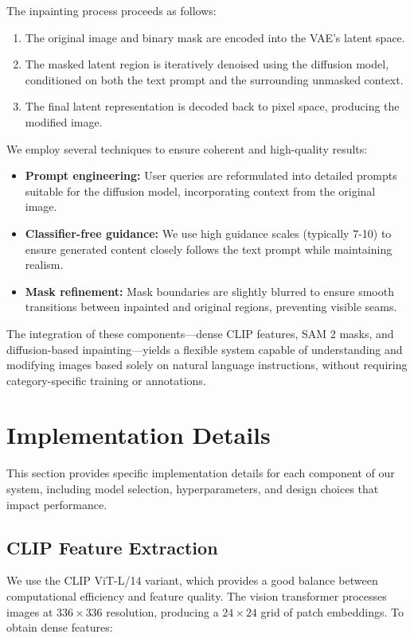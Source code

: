 The inpainting process proceeds as follows:
\begin{enumerate}
    \item The original image and binary mask are encoded into the VAE's latent space.
    \item The masked latent region is iteratively denoised using the diffusion model, conditioned on both the text prompt and the surrounding unmasked context.
    \item The final latent representation is decoded back to pixel space, producing the modified image.
\end{enumerate}

We employ several techniques to ensure coherent and high-quality results:
\begin{itemize}
    \item \textbf{Prompt engineering:} User queries are reformulated into detailed prompts suitable for the diffusion model, incorporating context from the original image.
    \item \textbf{Classifier-free guidance:} We use high guidance scales (typically 7-10) to ensure generated content closely follows the text prompt while maintaining realism.
    \item \textbf{Mask refinement:} Mask boundaries are slightly blurred to ensure smooth transitions between inpainted and original regions, preventing visible seams.
\end{itemize}

The integration of these components—dense CLIP features, SAM 2 masks, and diffusion-based inpainting—yields a flexible system capable of understanding and modifying images based solely on natural language instructions, without requiring category-specific training or annotations.

\section{Implementation Details}
This section provides specific implementation details for each component of our system, including model selection, hyperparameters, and design choices that impact performance.

\subsection{CLIP Feature Extraction}

We use the CLIP ViT-L/14 variant, which provides a good balance between computational efficiency and feature quality. The vision transformer processes images at $336 \times 336$ resolution, producing a $24 \times 24$ grid of patch embeddings. To obtain dense features:

